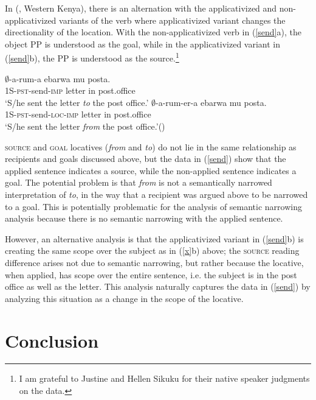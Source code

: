 \documentclass[output=paper]{langsci/langscibook}
\begin{document}
 

 In  (, Western Kenya), there is an alternation with the applicativized and  non-applicativized variants of the verb where applicativized variant changes the directionality of the location. With the non-applicativized verb in (\ref{send}a), the object PP is understood as the goal, while in the applicativized variant in (\ref{send}b), the PP is understood as the source.\footnote{I am grateful to Justine and Hellen Sikuku for their native speaker judgments on the  data.}

\begin{exe}
\ex\label{send} 
\begin{xlist}
\ex\gll $\emptyset$-a-rum-a ebarwa mu posta.\\
			{\scshape 1S-pst-}send-{\scshape imp} letter in post.office\\
			\glt `S/he sent the letter \emph{to} the post office.'
\ex\gll $\emptyset$-a-rum-er-a ebarwa mu posta.\\
			{\scshape 1S-pst-}send-{\scshape loc-imp} letter in post.office\\
			\glt `S/he sent the letter \emph{from} the post office.'\hfill ()
			\end{xlist}
\end{exe}
%
 {\scshape source} and {\scshape goal}  locatives (\emph{from} and \emph{to}) do not lie in the same relationship as recipients and goals discussed above, but the data in (\ref{send}) show that the applied sentence indicates a source, while the non-applied sentence indicates a goal. The potential problem is that \emph{from} is not a semantically narrowed interpretation of \emph{to}, in the way that a recipient was argued above to be narrowed to a goal. This is potentially problematic for the analysis of semantic narrowing analysis because there is no semantic narrowing with the applied sentence. 
 
 However, an alternative analysis is that the applicativized variant in (\ref{send}b) is creating the same scope over the subject as in (\ref{x}b) above; the {\scshape source} reading difference arises not due to semantic narrowing, but rather because the locative, when applied, has scope over the entire sentence, i.e. the subject is in the post office as well as the letter. This analysis naturally captures the data in (\ref{send}) by analyzing this situation as a change in the scope of the locative.
 \fi
 \section{Conclusion}%
 \label{sec:jerro:6}
  
\end{document}
